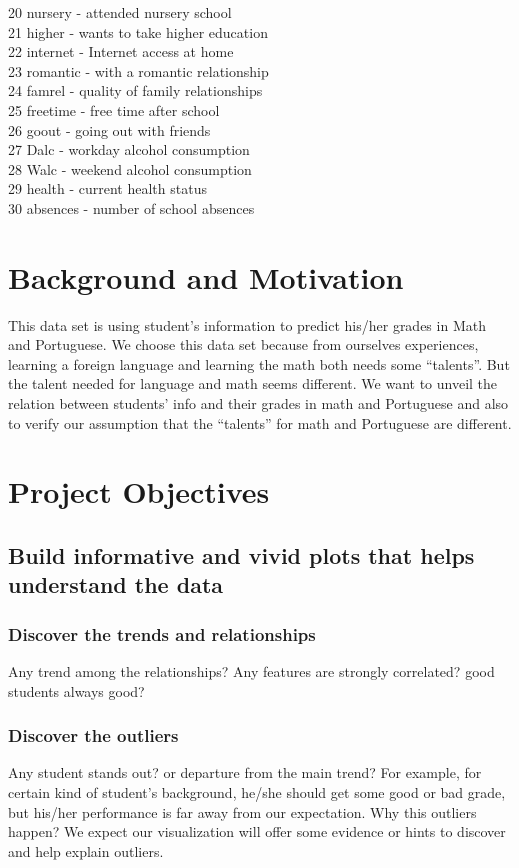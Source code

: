 \documentclass{article}
\begin{document}
20 nursery - attended nursery school  \\
21 higher - wants to take higher education  \\
22 internet - Internet access at home  \\
23 romantic - with a romantic relationship  \\
24 famrel - quality of family relationships  \\
25 freetime - free time after school  \\
26 goout - going out with friends \\
27 Dalc - workday alcohol consumption  \\
28 Walc - weekend alcohol consumption  \\
29 health - current health status  \\
30 absences - number of school absences \\
\section{Background and Motivation}
This data set is using student's information to predict his/her grades in Math and Portuguese.
We choose this data set because from ourselves experiences, learning a foreign language and learning the math both needs some ``talents''. But the talent needed for language and math seems different. We want to unveil the relation between students' info and their grades in math and Portuguese and also to verify our assumption that the ``talents'' for math and Portuguese are different.
\section{Project Objectives}
\subsection{Build informative and vivid plots that helps understand the data}
\subsubsection{Discover the trends and relationships}
Any trend among the relationships? Any features are strongly correlated?  good students always good? 
\subsubsection{Discover the outliers}
Any student stands out? or departure from the main trend? For example, for certain kind of student's background, he/she should get some good or bad grade, but his/her performance is far away from our expectation. Why this outliers happen? We expect our visualization will offer some evidence or hints to discover and help explain outliers.
\end{document}
